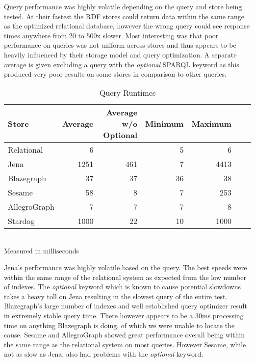 \documentclass{llncs}
\begin{document}
Query performance was highly volatile depending on the query and store being tested.
At their fastest the RDF stores could return data within the same range as the optimized relational database, however the wrong query could see response times anywhere from 20 to 500x slower.
Most interesting was that poor performance on queries was not uniform across stores and thus appears to be heavily influenced by their storage model and query optimization.
A separate average is given excluding a query with the \emph{optional} SPARQL keyword as this produced very poor results on some stores in comparison to other queries.

\vspace{-1.5em}
\begin{table}
\begin{center}
\caption{Query Runtimes}
\begin{tabular}{l | r | r | r | r | r | r}
    Store & Average & Average w/o Optional & Minimum & Maximum \\
\hline
Relational & 6 &  & 5 & 6 \\
Jena & 1251 & 461 & 7 & 4413  \\
Blazegraph & 37 & 37 & 36 & 38 \\
Sesame & 58 & 8 & 7 & 253  \\
AllegroGraph & 7 & 7 & 7 & 8 \\
Stardog & 1000 & 22 & 10 & 1000 \\
\end{tabular}
\\[5pt]
Measured in milliseconds
\end{center}
\end{table}
\vspace{-2em}

Jena's performance was highly volatile based on the query.
The best speeds were within the same range of the relational system as expected from the low number of indexes.
The \emph{optional} keyword which is known to cause potential slowdowns takes a heavy toll on Jena resulting in the slowest query of the entire test.
Blazegraph's large number of indexes and well established query optimizer result in extremely stable query time.
There however appears to be a 30ms processing time on anything Blazegraph is doing, of which we were unable to locate the cause.
Sesame and AllegroGraph showed great performance overall being within the same range as the relational system on most queries. 
However Sesame, while not as slow as Jena, also had problems with the \emph{optional} keyword.
\end{document}
